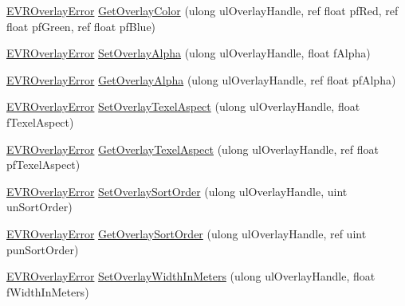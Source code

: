 \begin{DoxyCompactItemize}
\item 
\mbox{\hyperlink{namespace_valve_1_1_v_r_aaee5c5144f42b7969d45b854f51b0c18}{E\+V\+R\+Overlay\+Error}} \mbox{\hyperlink{class_valve_1_1_v_r_1_1_c_v_r_overlay_a862754bec837227cde72f59b18274054}{Get\+Overlay\+Color}} (ulong ul\+Overlay\+Handle, ref float pf\+Red, ref float pf\+Green, ref float pf\+Blue)
\item 
\mbox{\hyperlink{namespace_valve_1_1_v_r_aaee5c5144f42b7969d45b854f51b0c18}{E\+V\+R\+Overlay\+Error}} \mbox{\hyperlink{class_valve_1_1_v_r_1_1_c_v_r_overlay_a813f1c421db4878560061db98e26d252}{Set\+Overlay\+Alpha}} (ulong ul\+Overlay\+Handle, float f\+Alpha)
\item 
\mbox{\hyperlink{namespace_valve_1_1_v_r_aaee5c5144f42b7969d45b854f51b0c18}{E\+V\+R\+Overlay\+Error}} \mbox{\hyperlink{class_valve_1_1_v_r_1_1_c_v_r_overlay_aaa54b1fb8ac9ad522c89d714e56e607c}{Get\+Overlay\+Alpha}} (ulong ul\+Overlay\+Handle, ref float pf\+Alpha)
\item 
\mbox{\hyperlink{namespace_valve_1_1_v_r_aaee5c5144f42b7969d45b854f51b0c18}{E\+V\+R\+Overlay\+Error}} \mbox{\hyperlink{class_valve_1_1_v_r_1_1_c_v_r_overlay_a4d1c10992a6ee3a4f110e7ffc8b117d9}{Set\+Overlay\+Texel\+Aspect}} (ulong ul\+Overlay\+Handle, float f\+Texel\+Aspect)
\item 
\mbox{\hyperlink{namespace_valve_1_1_v_r_aaee5c5144f42b7969d45b854f51b0c18}{E\+V\+R\+Overlay\+Error}} \mbox{\hyperlink{class_valve_1_1_v_r_1_1_c_v_r_overlay_aa8a1e4190b56b2cf528b57b660719ebf}{Get\+Overlay\+Texel\+Aspect}} (ulong ul\+Overlay\+Handle, ref float pf\+Texel\+Aspect)
\item 
\mbox{\hyperlink{namespace_valve_1_1_v_r_aaee5c5144f42b7969d45b854f51b0c18}{E\+V\+R\+Overlay\+Error}} \mbox{\hyperlink{class_valve_1_1_v_r_1_1_c_v_r_overlay_a457d52502206c08eec6d881bacd7e8ec}{Set\+Overlay\+Sort\+Order}} (ulong ul\+Overlay\+Handle, uint un\+Sort\+Order)
\item 
\mbox{\hyperlink{namespace_valve_1_1_v_r_aaee5c5144f42b7969d45b854f51b0c18}{E\+V\+R\+Overlay\+Error}} \mbox{\hyperlink{class_valve_1_1_v_r_1_1_c_v_r_overlay_a94c15b933d503b6ee5202ec86af44455}{Get\+Overlay\+Sort\+Order}} (ulong ul\+Overlay\+Handle, ref uint pun\+Sort\+Order)
\item 
\mbox{\hyperlink{namespace_valve_1_1_v_r_aaee5c5144f42b7969d45b854f51b0c18}{E\+V\+R\+Overlay\+Error}} \mbox{\hyperlink{class_valve_1_1_v_r_1_1_c_v_r_overlay_a7fc09f63d5eb98b12972eb77acea0cd1}{Set\+Overlay\+Width\+In\+Meters}} (ulong ul\+Overlay\+Handle, float f\+Width\+In\+Meters)
\item 

\end{DoxyCompactItemize}
